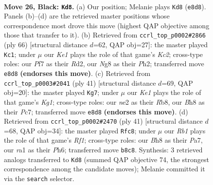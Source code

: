 \documentclass[11pt]{article}
\begin{document}
\clearpage

\begin{figure}[p]\centering
\begin{subfigure}{0.46\textwidth}\centering
\resizebox{\linewidth}{!}{%
\newchessgame
\chessboard[
  setfen={rr2k1nb/p2n1p1p/P1p3p1/2P1p3/4P2P/5P1B/4NB2/R4RK1 b - - 8 26},
  showmover=false,
  pgfstyle=straightmove, color=movearrow, markmove={e8-d8}
]}
\caption{}
\end{subfigure}\hfill
\begin{subfigure}{0.46\textwidth}\centering
\resizebox{\linewidth}{!}{%
\newchessgame
\chessboard[
  setfen={4rr2/1kp5/2b5/p1p2p1p/P1P1pP2/1P2N1P1/2KR3P/5R2 w - - 4 34},
  showmover=false,
  pgfstyle=straightmove, color=movearrow, markmove={c2-c1}
]}
\caption{}
\end{subfigure}
\\[4pt]
\begin{subfigure}{0.46\textwidth}\centering
\resizebox{\linewidth}{!}{%
\newchessgame
\chessboard[
  setfen={1r3rk1/2p5/p1npp1p1/1p6/4P1BP/1Pb1B3/P1P3P1/2KR3R b - - 0 21},
  showmover=false,
  pgfstyle=straightmove, color=movearrow, markmove={g8-g7}
]}
\caption{}
\end{subfigure}\hfill
\begin{subfigure}{0.46\textwidth}\centering
\resizebox{\linewidth}{!}{%
\newchessgame
\chessboard[
  setfen={r4rk1/p3bpp1/2p1p2p/4N2P/3Pn3/4B3/PP3PP1/2KR3R b - - 2 21},
  showmover=false,
  pgfstyle=straightmove, color=movearrow, markmove={f8-c8}
]}
\caption{}
\end{subfigure}
\caption{\textbf{Move 26, Black: \texttt{Kd8}.} (a) Our position; Melanie plays \texttt{Kd8} (\texttt{e8d8}). Panels (b)--(d) are the retrieved master positions whose correspondence most drove this move (highest QAP objective among those that transfer to it). (b) Retrieved from \texttt{ccrl\_top\_p0002\#2866} (ply 66) [structural distance $d$=62, QAP obj=27]: the master played \texttt{Kc1}; under $\mu$ our \emph{Ke1} plays the role of that game's \emph{Kc2}; cross-type roles: our \emph{P}f7 as their \emph{R}d2, our \emph{N}g8 as their \emph{P}h2; transferred move \texttt{e8d8} \textbf{(endorses this move)}. (c) Retrieved from \texttt{ccrl\_top\_p0003\#2041} (ply 41) [structural distance $d$=69, QAP obj=20]: the master played \texttt{Kg7}; under $\mu$ our \emph{Ke1} plays the role of that game's \emph{Kg1}; cross-type roles: our \emph{n}e2 as their \emph{R}b8, our \emph{B}h8 as their \emph{P}c7; transferred move \texttt{e8d8} \textbf{(endorses this move)}. (d) Retrieved from \texttt{ccrl\_top\_p0002\#2470} (ply 41) [structural distance $d$=68, QAP obj=34]: the master played \texttt{Rfc8}; under $\mu$ our \emph{Rb1} plays the role of that game's \emph{Rf1}; cross-type roles: our \emph{B}h8 as their \emph{P}a7, our \emph{r}a1 as their \emph{P}h6; transferred move \texttt{b8c8}. Synthesis: 3 retrieved analogs transferred to \texttt{Kd8} (summed QAP objective 74, the strongest correspondence among the candidate moves); Melanie committed it via the \texttt{search} selector.}
\label{fig:thought-m51}
\end{figure}
\end{document}
